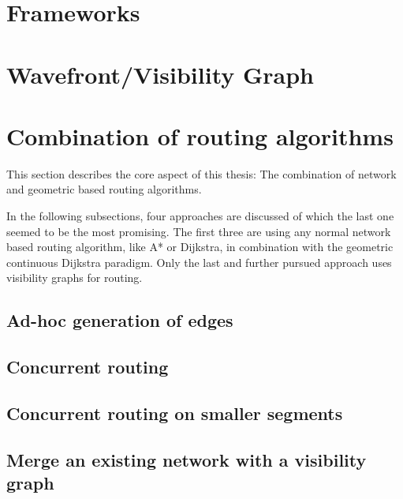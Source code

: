 
\section{Frameworks}


\section{Wavefront/Visibility Graph}


\section{Combination of routing algorithms}

	This section describes the core aspect of this thesis:
	The combination of network and geometric based routing algorithms.
	
	In the following subsections, four approaches are discussed of which the last one seemed to be the most promising.
	The first three are using any normal network based routing algorithm, like A* or Dijkstra, in combination with the geometric continuous Dijkstra paradigm.
	Only the last and further pursued approach uses visibility graphs for routing.

	\subsection{Ad-hoc generation of edges}
	
	\subsection{Concurrent routing}
	
	\subsection{Concurrent routing on smaller segments}
	
	\subsection{Merge an existing network with a visibility graph}